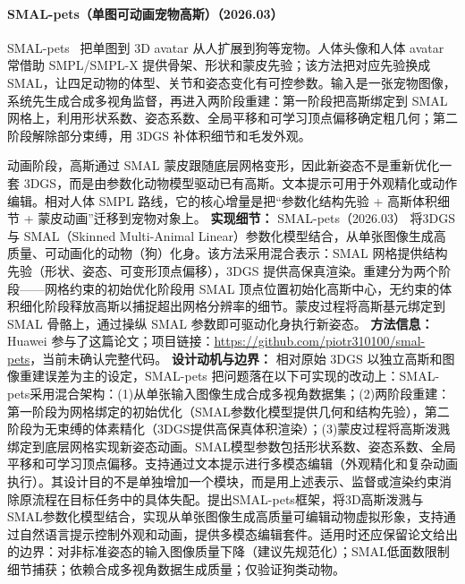 \paragraph{SMAL-pets（单图可动画宠物高斯）（2026.03）}
SMAL-pets~\cite{2603_17131} 把单图到 3D avatar 从人扩展到狗等宠物。人体头像和人体 avatar 常借助 SMPL/SMPL-X 提供骨架、形状和蒙皮先验；该方法把对应先验换成 SMAL，让四足动物的体型、关节和姿态变化有可控参数。输入是一张宠物图像，系统先生成合成多视角监督，再进入两阶段重建：第一阶段把高斯绑定到 SMAL 网格上，利用形状系数、姿态系数、全局平移和可学习顶点偏移确定粗几何；第二阶段解除部分束缚，用 3DGS 补体积细节和毛发外观。

动画阶段，高斯通过 SMAL 蒙皮跟随底层网格变形，因此新姿态不是重新优化一套 3DGS，而是由参数化动物模型驱动已有高斯。文本提示可用于外观精化或动作编辑。相对人体 SMPL 路线，它的核心增量是把“参数化结构先验 + 高斯体积细节 + 蒙皮动画”迁移到宠物对象上。
\textbf{实现细节：} SMAL-pets（2026.03） 将3DGS与 SMAL（Skinned Multi-Animal Linear）参数化模型结合，从单张图像生成高质量、可动画化的动物（狗）化身。该方法采用混合表示：SMAL 网格提供结构先验（形状、姿态、可变形顶点偏移），3DGS 提供高保真渲染。重建分为两个阶段——网格约束的初始优化阶段用 SMAL 顶点位置初始化高斯中心，无约束的体积细化阶段释放高斯以捕捉超出网格分辨率的细节。蒙皮过程将高斯基元绑定到 SMAL 骨骼上，通过操纵 SMAL 参数即可驱动化身执行新姿态。
\textbf{方法信息：} Huawei 参与了这篇论文；项目链接：\url{https://github.com/piotr310100/smal-pets}，当前未确认完整代码。
\textbf{设计动机与边界：} 相对原始 3DGS 以独立高斯和图像重建误差为主的设定，SMAL-pets 把问题落在以下可实现的改动上：SMAL-pets采用混合架构：(1)从单张输入图像生成合成多视角数据集；(2)两阶段重建：第一阶段为网格绑定的初始优化（SMAL参数化模型提供几何和结构先验），第二阶段为无束缚的体素精化（3DGS提供高保真体积渲染）；(3)蒙皮过程将高斯泼溅绑定到底层网格实现新姿态动画。SMAL模型参数包括形状系数、姿态系数、全局平移和可学习顶点偏移。支持通过文本提示进行多模态编辑（外观精化和复杂动画执行）。其设计目的不是单独增加一个模块，而是用上述表示、监督或渲染约束消除原流程在目标任务中的具体失配。提出SMAL-pets框架，将3D高斯泼溅与SMAL参数化模型结合，实现从单张图像生成高质量可编辑动物虚拟形象，支持通过自然语言提示控制外观和动画，提供多模态编辑套件。适用时还应保留论文给出的边界：对非标准姿态的输入图像质量下降（建议先规范化）；SMAL低面数限制细节捕获；依赖合成多视角数据生成质量；仅验证狗类动物。
